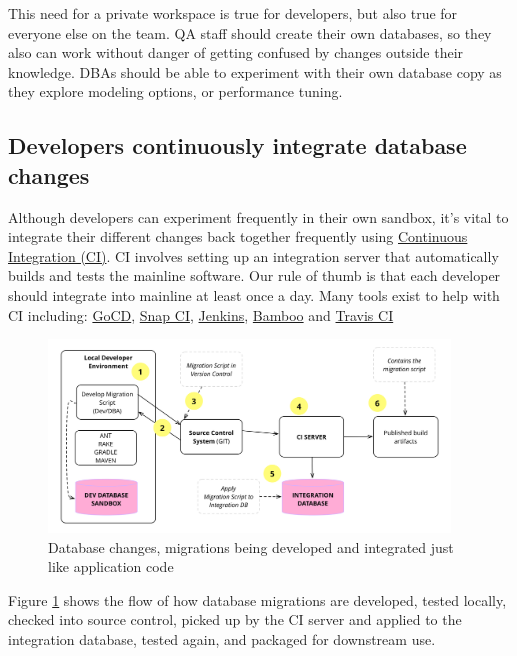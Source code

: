 \documentclass[12pt]{article}
\begin{document}
This need for a private workspace is true for developers, but also true
for everyone else on the team. QA staff should create their own
databases, so they also can work without danger of getting confused by
changes outside their knowledge. DBAs should be able to experiment with
their own database copy as they explore modeling options, or performance
tuning.

\subsection{Developers continuously integrate database changes}

Although developers can experiment frequently in their own sandbox, it's
vital to integrate their different changes back together frequently
using
\href{https://martinfowler.com/articles/continuousIntegration.html}{Continuous
Integration (CI)}. CI involves setting up an integration server that
automatically builds and tests the mainline software. Our rule of thumb
is that each developer should integrate into mainline at least once a
day. Many tools exist to help with CI including:
\href{https://www.gocd.org/}{GoCD}, \href{https://snap-ci.com/}{Snap
CI}, \href{https://jenkins.io/}{Jenkins},
\href{https://www.atlassian.com/software/bamboo}{Bamboo} and
\href{https://travis-ci.com/}{Travis CI}

\begin{figure}[H]
  \begin{center}
    \includegraphics[width=0.95\textwidth]{ciworkflow}
  \end{center}
  \caption{Database changes, migrations being developed and integrated just like application code}
  \label{fig:ciworkflow}
\end{figure}

Figure \ref{fig:ciworkflow} shows the flow of how database migrations are
developed, tested locally, checked into source control, picked up by the
CI server and applied to the integration database, tested again, and
packaged for downstream use.
\end{document}
